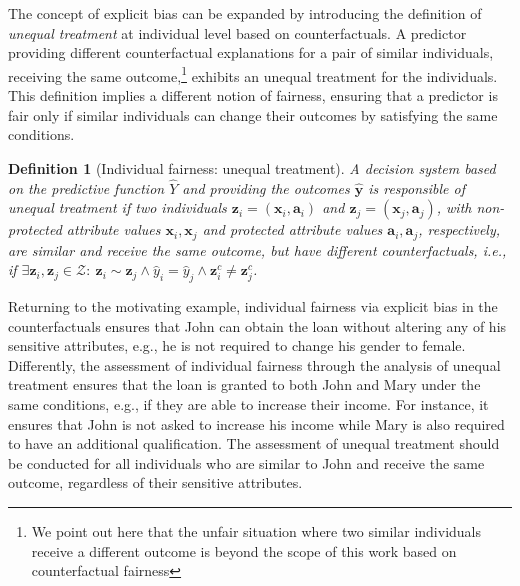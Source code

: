 \documentclass[letterpaper]{article} %
\newtheorem{definition}{Definition}
\begin{document}
The concept of explicit bias can be expanded by introducing the definition of \emph{unequal treatment} at individual level based on counterfactuals.
%
A predictor providing different counterfactual explanations for a pair of similar individuals, receiving the same outcome,\footnote{We point out here that the unfair situation where two similar individuals receive a different outcome is beyond the scope of this work based on counterfactual fairness} exhibits an unequal treatment for the individuals.
%
This definition implies a different notion of fairness, ensuring that a predictor is fair only if similar individuals can change their outcomes by satisfying the same conditions. 

\begin{definition}[Individual fairness: unequal treatment]\label{unequal_treatment}
	A decision system based on the predictive function $\hat{Y}$ and providing the outcomes $\boldsymbol{\hat{y}}$ is responsible of \emph{unequal treatment} if two individuals $\boldsymbol{z}_i = (\boldsymbol{x}_i, \boldsymbol{a}_i)$ and $\boldsymbol{z}_j = (\boldsymbol{x}_j, \boldsymbol{a}_j)$, with non-protected attribute values $\boldsymbol{x}_i, \boldsymbol{x}_j$ and protected attribute values $\boldsymbol{a}_i, \boldsymbol{a}_j$, respectively, are similar and receive the same outcome, but have different counterfactuals, i.e., if $\exists \boldsymbol{z}_i, \boldsymbol{z}_j \in \mathcal{Z} : ~ \boldsymbol{z}_i \sim \boldsymbol{z}_j \wedge \hat{y}_i = \hat{y}_j \wedge \boldsymbol{z}_i^c \neq \boldsymbol{z}_j^c$.
\end{definition}

Returning to the motivating example, individual fairness via explicit bias in the counterfactuals ensures that John can obtain the loan without altering any of his sensitive attributes, e.g., he is not required to change his gender to female.
%
Differently, the assessment of individual fairness through the analysis of unequal treatment ensures that the loan is granted to both John and Mary under the same conditions, e.g., if they are able to increase their income. For instance, it ensures that John is not asked to increase his income while Mary is also required to have an additional qualification.
%
The assessment of unequal treatment should be conducted for all individuals who are similar to John and receive the same outcome, regardless of their sensitive attributes.
\end{document}
